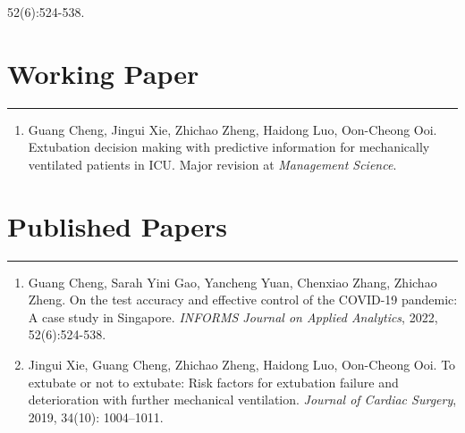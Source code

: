 \documentclass[12pt, a4paper]{article}
\begin{document}
{52(6):524-538.

\section*{Working Paper}
\vspace*{0.4em}
\hrule height 0.5pt
\begin{enumerate}[leftmargin=28pt, itemsep=6pt, parsep=0.2pt, topsep=1pt]

	\item Guang Cheng, Jingui Xie, Zhichao Zheng, Haidong Luo, Oon-Cheong Ooi.
	Extubation decision making with predictive information for mechanically ventilated patients in ICU.
	Major revision at {\it Management Science}.


\end{enumerate}




\section*{Published Papers}
\vspace*{0.4em}
\hrule height 0.5pt
\begin{enumerate}[leftmargin=28pt, itemsep=6pt, parsep=0.2pt, topsep=1pt]

	\item Guang Cheng, Sarah Yini Gao, Yancheng Yuan, Chenxiao Zhang, Zhichao Zheng. 
	On the test accuracy and effective control of the COVID-19 pandemic: A case study in Singapore. 
	{\it INFORMS Journal on Applied Analytics}, 2022, 52(6):524-538.

	\item Jingui Xie, Guang Cheng, Zhichao Zheng, Haidong Luo, Oon-Cheong Ooi. 
	To extubate or not to extubate: Risk factors for extubation failure and deterioration with further mechanical ventilation. 
	{\it Journal of Cardiac Surgery}, 2019, 34(10): 1004–1011. 


\end{enumerate}}
\end{document}
